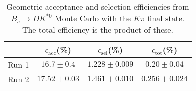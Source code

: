 \begin{table}
    \centering
    \begin{tabular}{cccc}
        \toprule
        & $\epsilon_\mathrm{acc}$(\%) &  $\epsilon_\mathrm{sel}$(\%) &  $\epsilon_\mathrm{tot}$(\%) \\
        \midrule
        Run 1 & $16.7 \pm 0.4$ & $1.228 \pm 0.009$ & $0.20 \pm 0.04$ \\
        Run 2 & $17.52 \pm 0.03$ & $1.461 \pm 0.010$ & $0.256 \pm 0.024$ \\
        \bottomrule
    \end{tabular}
    \caption{Geometric acceptance and selection efficiencies from  $B_s \to DK^{*0}$ Monte Carlo with the $K\pi$ final state.  The total efficiency is the product of these.}
\label{tab:selection_efficiency_Bs}
\end{table}
